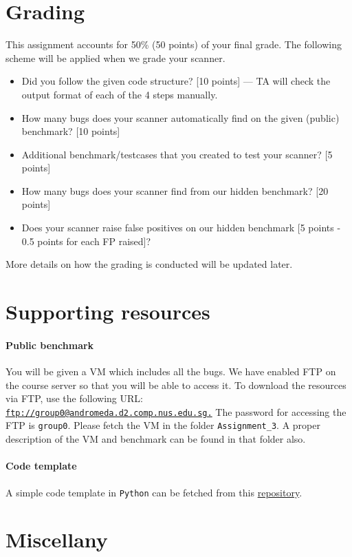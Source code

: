 \documentclass{article}[10pt]
\begin{document}
\section{Grading}
This assignment accounts for 50\% (50 points) of your final grade. The following scheme will be applied when we grade your scanner.
	\begin{itemize}
	\item Did you follow the given code structure? [10 points] --- TA will check the output format of each of the 4 steps manually.
	\item How many bugs does your scanner automatically find on the given (public) benchmark? [10 points]
	\item Additional benchmark/testcases that you created to test your scanner? [5 points]
	\item How many bugs does your scanner find from our hidden benchmark? [20 points]
	\item Does your scanner raise false positives on our hidden benchmark [5 points - 0.5 points for each FP raised]?
	\end{itemize}

More details on how the grading is conducted will be updated later.


\section{Supporting resources}
\paragraph{Public benchmark} You will be given a VM which includes all the bugs. We have enabled FTP on 
the course server so that you will be able to access it. To download 
the resources via FTP, use the following URL: 
\href{ftp://group0@andromeda.d2.comp.nus.edu.sg}{\tt ftp://group0@andromeda.d2.comp.nus.edu.sg.}
The password for accessing the FTP is \texttt{group0}. Please fetch the VM in the folder {\tt Assignment\_3}. A proper description of the VM and benchmark can be found in that folder also.

\paragraph{Code template} A simple code template in {\tt Python} can be fetched from this \href{https://github.com/will_udpate_later}{repository}.

\section{Miscellany}
\end{document}
